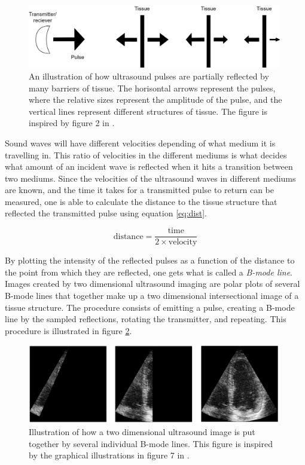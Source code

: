 \begin{figure}[H]
    \centering
    \includegraphics[width=0.99\textwidth]{echocardiography/US_reflection.png}
    \caption{An illustration of how ultrasound pulses are partially reflected by many barriers of tissue. The horisontal arrows represent the pulses, where the relative sizes represent the amplitude of the pulse, and the vertical lines represent different structures of tissue. The figure is inspired by figure 2 in \cite{basic_ultrasound}.}
    \label{fig:us_reflect}
\end{figure}

Sound waves will have different velocities depending of what medium it is travelling in. This ratio of velocities in the different mediums is what decides what amount of an incident wave is reflected when it hits a transition between two mediums. Since the velocities of the ultrasound waves in different mediums are known, and the time it takes for a transmitted pulse to return can be measured, one is able to calculate the distance to the tissue structure that reflected the transmitted pulse using equation \eqref{eq:dist}. 

\begin{equation}
    \mathrm{distance} = \frac{\mathrm{time}}{2 \times \mathrm{velocity}}
    \label{eq:dist}
\end{equation}

By plotting the intensity of the reflected pulses as a function of the distance to the point from which they are reflected, one gets what is called a \textit{B-mode line}. Images created by two dimensional ultrasound imaging are polar plots of several B-mode lines that together make up a two dimensional intersectional image of a tissue structure. The procedure consists of emitting a pulse, creating a B-mode line by the sampled reflections, rotating the transmitter, and repeating. This procedure is illustrated in figure \ref{fig:b_mode_search}.

\begin{figure}[H]
    \centering
    \includegraphics[width=0.99\textwidth]{echocardiography/b_mode_search.png}
    \caption{Illustration of how a two dimensional ultrasound image is put together by several individual B-mode lines. This figure is inspired by the graphical illustrations in figure 7 in \cite{basic_ultrasound}.}
    \label{fig:b_mode_search}
\end{figure}

